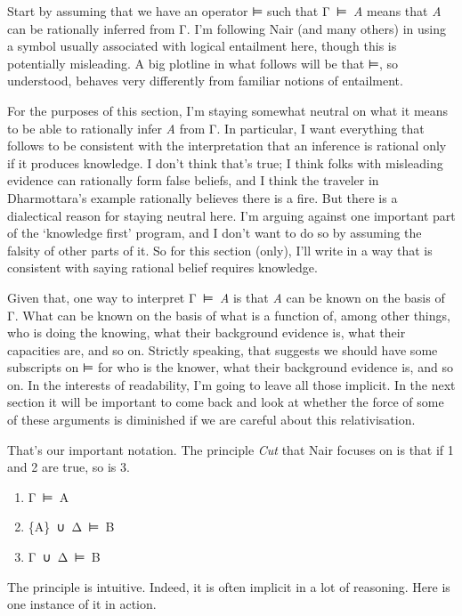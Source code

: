 \documentclass[
  10pt,
  letterpaper,
  twoside]{scrbook}
\providecommand{\tightlist}{%
  \setlength{\itemsep}{0pt}\setlength{\parskip}{0pt}}\usepackage{longtable,booktabs,array}
\begin{document}
Start by assuming that we have an operator ⊨ such that Γ~⊨~\emph{A}
means that \emph{A} can be rationally inferred from Γ. I'm following
Nair (and many others) in using a symbol usually associated with logical
entailment here, though this is potentially misleading. A big plotline
in what follows will be that ⊨, so understood, behaves very differently
from familiar notions of entailment.

For the purposes of this section, I'm staying somewhat neutral on what
it means to be able to rationally infer \emph{A} from Γ. In particular,
I want everything that follows to be consistent with the interpretation
that an inference is rational only if it produces knowledge. I don't
think that's true; I think folks with misleading evidence can rationally
form false beliefs, and I think the traveler in Dharmottara's example
rationally believes there is a fire. But there is a dialectical reason
for staying neutral here. I'm arguing against one important part of the
`knowledge first' program, and I don't want to do so by assuming the
falsity of other parts of it. So for this section (only), I'll write in
a way that is consistent with saying rational belief requires knowledge.

Given that, one way to interpret Γ~⊨~\emph{A} is that \emph{A} can be
known on the basis of Γ. What can be known on the basis of what is a
function of, among other things, who is doing the knowing, what their
background evidence is, what their capacities are, and so on. Strictly
speaking, that suggests we should have some subscripts on ⊨ for who is
the knower, what their background evidence is, and so on. In the
interests of readability, I'm going to leave all those implicit. In the
next section it will be important to come back and look at whether the
force of some of these arguments is diminished if we are careful about
this relativisation.

That's our important notation. The principle \emph{Cut} that Nair
focuses on is that if 1 and 2 are true, so is 3.

\begin{enumerate}
\def\labelenumi{\arabic{enumi}.}
\tightlist
\item
  Γ~⊨~A
\item
  \{A\}~∪~Δ~⊨~B
\item
  Γ~∪~Δ~⊨~B
\end{enumerate}

The principle is intuitive. Indeed, it is often implicit in a lot of
reasoning. Here is one instance of it in action.
\end{document}

